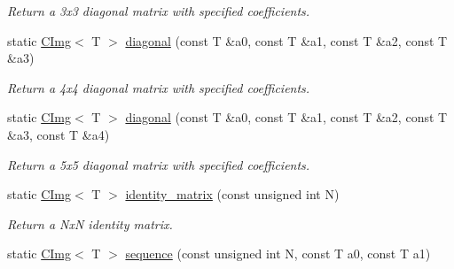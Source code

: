 \begin{DoxyCompactItemize}
\begin{DoxyCompactList}\small\item\em Return a 3x3 diagonal matrix with specified coefficients. \item\end{DoxyCompactList}\item 
\hypertarget{structcimg__library_1_1CImg_af6ad181903a88ac52f15222dd28bba42}{
static \hyperlink{structcimg__library_1_1CImg}{CImg}$<$ T $>$ \hyperlink{structcimg__library_1_1CImg_af6ad181903a88ac52f15222dd28bba42}{diagonal} (const T \&a0, const T \&a1, const T \&a2, const T \&a3)}
\label{structcimg__library_1_1CImg_af6ad181903a88ac52f15222dd28bba42}

\begin{DoxyCompactList}\small\item\em Return a 4x4 diagonal matrix with specified coefficients. \item\end{DoxyCompactList}\item 
\hypertarget{structcimg__library_1_1CImg_a8e8f3b19a8f866cb9b06c4667412abfd}{
static \hyperlink{structcimg__library_1_1CImg}{CImg}$<$ T $>$ \hyperlink{structcimg__library_1_1CImg_a8e8f3b19a8f866cb9b06c4667412abfd}{diagonal} (const T \&a0, const T \&a1, const T \&a2, const T \&a3, const T \&a4)}
\label{structcimg__library_1_1CImg_a8e8f3b19a8f866cb9b06c4667412abfd}

\begin{DoxyCompactList}\small\item\em Return a 5x5 diagonal matrix with specified coefficients. \item\end{DoxyCompactList}\item 
\hypertarget{structcimg__library_1_1CImg_a14131b116119f392019c431f6eac5c6f}{
static \hyperlink{structcimg__library_1_1CImg}{CImg}$<$ T $>$ \hyperlink{structcimg__library_1_1CImg_a14131b116119f392019c431f6eac5c6f}{identity\_\-matrix} (const unsigned int N)}
\label{structcimg__library_1_1CImg_a14131b116119f392019c431f6eac5c6f}

\begin{DoxyCompactList}\small\item\em Return a NxN identity matrix. \item\end{DoxyCompactList}\item 
\hypertarget{structcimg__library_1_1CImg_a87cb488d5c29e94e13ff5a6af3112034}{
static \hyperlink{structcimg__library_1_1CImg}{CImg}$<$ T $>$ \hyperlink{structcimg__library_1_1CImg_a87cb488d5c29e94e13ff5a6af3112034}{sequence} (const unsigned int N, const T a0, const T a1)}
\label{structcimg__library_1_1CImg_a87cb488d5c29e94e13ff5a6af3112034}


\end{DoxyCompactItemize}
